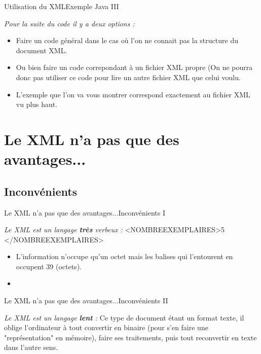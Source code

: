 \documentclass{beamer}
\begin{document}
     \begin{frame}{Utilisation du XML}{Exemple Java III}
       \begin{block}{
        \textit{Pour la suite du code il y a deux options :}}
        \begin{itemize}
            \item Faire un code général dans le cas où l'on ne connait pas la structure du document XML.\pause
            \item
            Ou bien faire un code correpondant à un fichier XML propre (On ne pourra donc pas utiliser ce code pour lire un autre fichier XML que celui voulu. \pause
            \item{
            L'exemple que l'on va vous montrer correspond exactement au fichier XML vu plus haut.}
        \end{itemize}
       \end{block}
    \end{frame}
    
\section{Le XML n'a pas que des avantages...}
\subsection{Inconvénients}
    \begin{frame}{Le XML n'a pas que des avantages...}{Inconvénients I}
      \begin{block}{\textit{Le XML est un langage \textbf{très} verbeux :}}
             \textless NOMBREEXEMPLAIRES\textgreater 5 \textless/NOMBREEXEMPLAIRES\textgreater
              \begin{itemize}
                \item{
                  L'information n'occupe qu'un octet mais les balises qui l'entourent en occupent 39 (octets).
                  }\pause
                  \item{
                  }
                \end{itemize}
        \end{block}
    \end{frame}
    
        \begin{frame}{Le XML n'a pas que des avantages...}{Inconvénients II}
      \begin{block}{\textit{Le XML est un langage \textbf{lent} :}}
Ce type de document étant un format texte, il oblige l'ordinateur à tout convertir en binaire (pour s'en faire une "représentation" en mémoire), faire ses traitements, puis tout reconvertir en texte dans l'autre sens.
        \end{block}
    \end{frame}
    
\end{document}
